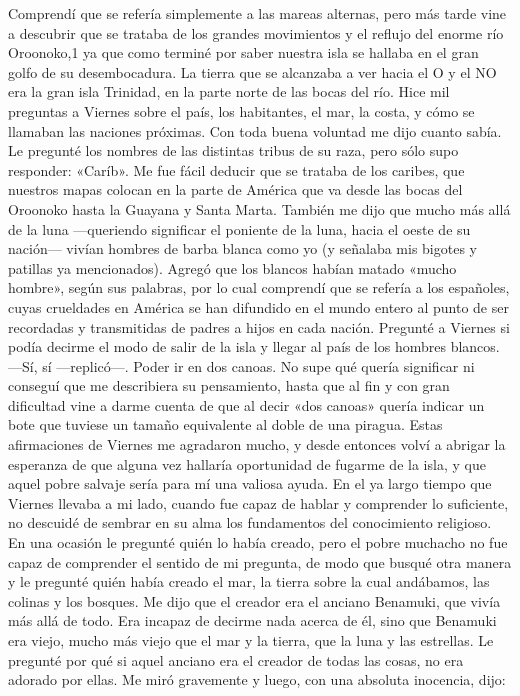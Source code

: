\documentclass{novela}
\begin{document}
    Comprendí que se refería simplemente a las mareas alternas, pero más tarde vine a descubrir que se trataba de los grandes movimientos y el reflujo del enorme río Oroonoko,1 ya que como terminé por saber nuestra isla se hallaba en el gran golfo de su desembocadura. La tierra que se alcanzaba a ver hacia el O y el NO era la gran isla Trinidad, en la parte norte de las bocas del río. Hice mil preguntas a Viernes sobre el país, los habitantes, el mar, la costa, y cómo se llamaban las naciones próximas. Con toda buena voluntad me dijo cuanto sabía. Le pregunté los nombres de las distintas tribus de su raza, pero sólo supo responder: «Caríb». Me fue fácil deducir que se trataba de los caribes, que nuestros mapas colocan en la parte de América que va desde las bocas del Oroonoko hasta la Guayana y Santa Marta. También me dijo que mucho más allá de la luna —queriendo significar el poniente de la luna, hacia el oeste de su nación— vivían hombres de barba blanca como yo (y señalaba mis bigotes y patillas ya mencionados). Agregó que los blancos habían matado «mucho hombre», según sus palabras, por lo cual comprendí que se refería a los españoles, cuyas crueldades en América se han difundido en el mundo entero al punto de ser recordadas y transmitidas de padres a hijos en cada nación.
    Pregunté a Viernes si podía decirme el modo de salir de la isla y llegar al país de los hombres blancos.
    —Sí, sí —replicó—. Poder ir en dos canoas.
    No supe qué quería significar ni conseguí que me describiera su pensamiento, hasta que al fin y con gran dificultad vine a darme cuenta de que al decir «dos canoas» quería indicar un bote que tuviese un tamaño equivalente al doble de una piragua.
    Estas afirmaciones de Viernes me agradaron mucho, y desde entonces volví a abrigar la esperanza de que alguna vez hallaría oportunidad de fugarme de la isla, y que aquel pobre salvaje sería para mí una valiosa ayuda.
    En el ya largo tiempo que Viernes llevaba a mi lado, cuando fue capaz de hablar y comprender lo suficiente, no descuidé de sembrar en su alma los fundamentos del conocimiento religioso. En una ocasión le pregunté quién lo había creado, pero el pobre muchacho no fue capaz de comprender el sentido de mi pregunta, de modo que busqué otra manera y le pregunté quién había creado el mar, la tierra sobre la cual andábamos, las colinas y los bosques. Me dijo que el creador era el anciano Benamuki, que vivía más allá de todo. Era incapaz de decirme nada acerca de él, sino que Benamuki era viejo, mucho más viejo que el mar y la tierra, que la luna y las estrellas. Le pregunté por qué si aquel anciano era el creador de todas las cosas, no era adorado por ellas. Me miró gravemente y luego, con una absoluta inocencia, dijo:
\end{document}
